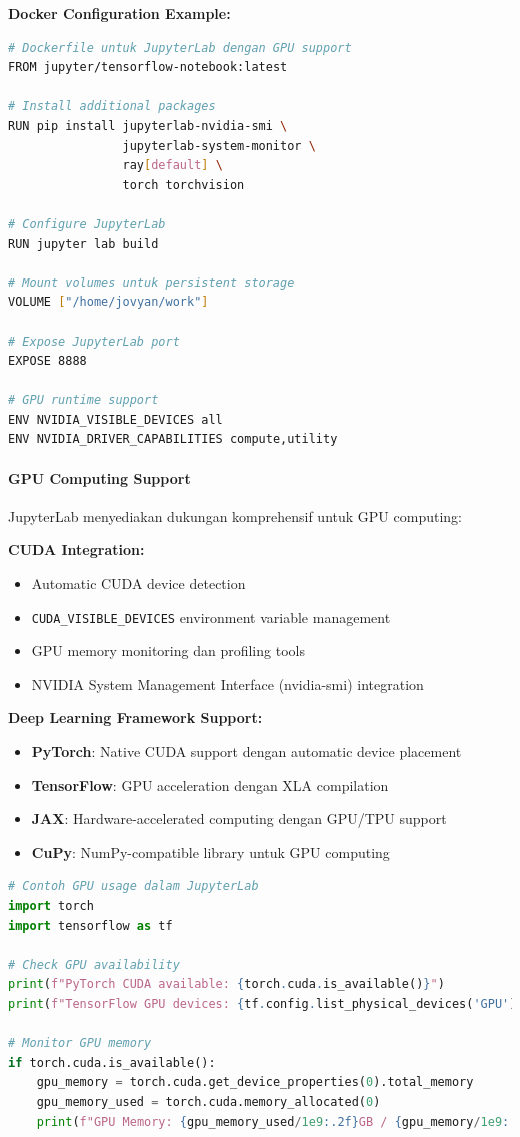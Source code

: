 \textbf{Docker Configuration Example:}
\begin{lstlisting}[language=bash]
# Dockerfile untuk JupyterLab dengan GPU support
FROM jupyter/tensorflow-notebook:latest

# Install additional packages
RUN pip install jupyterlab-nvidia-smi \
                jupyterlab-system-monitor \
                ray[default] \
                torch torchvision

# Configure JupyterLab
RUN jupyter lab build

# Mount volumes untuk persistent storage
VOLUME ["/home/jovyan/work"]

# Expose JupyterLab port
EXPOSE 8888

# GPU runtime support
ENV NVIDIA_VISIBLE_DEVICES all
ENV NVIDIA_DRIVER_CAPABILITIES compute,utility
\end{lstlisting}

\paragraph{GPU Computing Support}

JupyterLab menyediakan dukungan komprehensif untuk GPU computing:

\textbf{CUDA Integration:}
\begin{itemize}
\item Automatic CUDA device detection
\item \texttt{CUDA\_VISIBLE\_DEVICES} environment variable management
\item GPU memory monitoring dan profiling tools
\item NVIDIA System Management Interface (nvidia-smi) integration
\end{itemize}

\textbf{Deep Learning Framework Support:}
\begin{itemize}
\item \textbf{PyTorch}: Native CUDA support dengan automatic device placement
\item \textbf{TensorFlow}: GPU acceleration dengan XLA compilation
\item \textbf{JAX}: Hardware-accelerated computing dengan GPU/TPU support
\item \textbf{CuPy}: NumPy-compatible library untuk GPU computing
\end{itemize}

\begin{lstlisting}[language=Python]
# Contoh GPU usage dalam JupyterLab
import torch
import tensorflow as tf

# Check GPU availability
print(f"PyTorch CUDA available: {torch.cuda.is_available()}")
print(f"TensorFlow GPU devices: {tf.config.list_physical_devices('GPU')}")

# Monitor GPU memory
if torch.cuda.is_available():
    gpu_memory = torch.cuda.get_device_properties(0).total_memory
    gpu_memory_used = torch.cuda.memory_allocated(0)
    print(f"GPU Memory: {gpu_memory_used/1e9:.2f}GB / {gpu_memory/1e9:.2f}GB")
\end{lstlisting}

